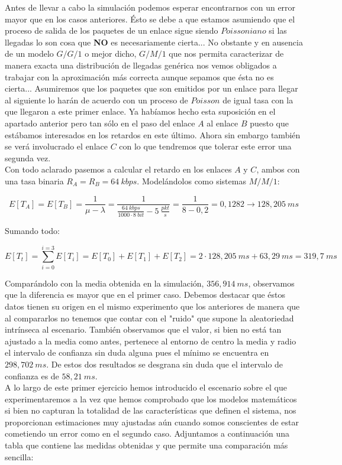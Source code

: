 \documentclass{article}[10pt]
\begin{document}
		Antes de llevar a cabo la simulación podemos esperar encontrarnos con un error mayor que en los casos anteriores. Ésto se debe a que estamos asumiendo que el proceso de salida de los paquetes de un enlace sigue siendo $Poissoniano$ si las llegadas lo son cosa que \textbf{NO} es necesariamente cierta... No obstante y en ausencia de un modelo $G/G/1$ o mejor dicho, $G/M/1$ que nos permita caracterizar de manera exacta una distribución de llegadas genérica nos vemos obligados a trabajar con la aproximación más correcta aunque sepamos que ésta no es cierta... Asumiremos que los paquetes que son emitidos por un enlace para llegar al siguiente lo harán de acuerdo con un proceso de $Poisson$ de igual tasa con la que llegaron a este primer enlace. Ya habíamos hecho esta suposición en el apartado anterior pero tan sólo en el paso del enlace $A$ al enlace $B$ puesto que estábamos interesados en los retardos en este último. Ahora sin embargo también se verá involucrado el enlace $C$ con lo que tendremos que tolerar este error una segunda vez.\\

		Con todo aclarado pasemos a calcular el retardo en los enlaces $A$ y $C$, ambos con una tasa binaria $R_A = R_B = 64\ kbps$. Modelándolos como sistemas $M/M/1$:

		$$E[T_A] = E[T_B] = \frac{1}{\mu - \lambda} = \frac{1}{\frac{64\ kbps}{1000 \cdot 8\ bit} - 5\ \frac{pkt}{s}} = \frac{1}{8 - 0,2} = 0,1282 \rightarrow 128,205\ ms$$

		Sumando todo:

		$$E[T_t] = \sum_{i = 0}^{i = 3}E[T_i] = E[T_0] + E[T_1] + E[T_2] = 2 \cdot 128,205\ ms + 63,29\ ms = 319,7\ ms$$

		Comparándolo con la media obtenida en la simulación, $356,914\ ms$, observamos que la diferencia es mayor que en el primer caso. Debemos destacar que éstos datos tienen su origen en el mismo experimento que los anteriores de manera que al compararlos no tenemos que contar con el "ruido" que supone la aleatoriedad intrínseca al escenario. También observamos que el valor, si bien no está tan ajustado a la media como antes, pertenece al entorno de centro la media y radio el intervalo de confianza sin duda alguna pues el mínimo se encuentra en $298,702\ ms$. De estos dos resultados se desgrana sin duda que el intervalo de confianza es de $58,21\ ms$.\\

		A lo largo de este primer ejercicio hemos introducido el escenario sobre el que experimentaremos a la vez que hemos comprobado que los modelos matemáticos si bien no capturan la totalidad de las características que definen el sistema, nos proporcionan estimaciones muy ajustadas aún cuando somos conscientes de estar cometiendo un error como en el segundo caso. Adjuntamos a continuación una tabla que contiene las medidas obtenidas y que permite una comparación más sencilla:
\end{document}
